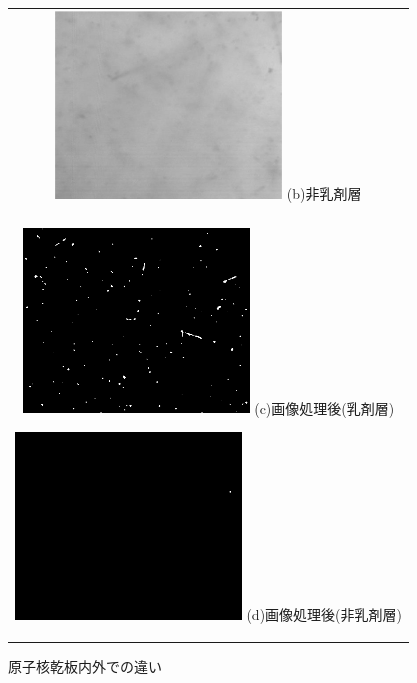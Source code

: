 \documentclass[12pt,a4paper]{jarticle}
\begin{document}
\begin{figure}[htbp]
\begin{tabular}{c}
        \begin{minipage}{0.5\hsize}
          \centering
            \includegraphics[clip, width=60mm]{emulsion_out.png}
            \hspace{1.6cm} (b)非乳剤層
        \end{minipage}
        \\
        \\
        \begin{minipage}{0.5\hsize}
          \centering
              \includegraphics[clip, width=60mm]{emul_in_thre.png}
              \hspace{1.6cm} (c)画像処理後(乳剤層)
          \end{minipage}
          
        \begin{minipage}{0.5\hsize}
          \centering
              \includegraphics[clip, width=60mm]{emul_out_thre.png}
              \hspace{1.6cm} (d)画像処理後(非乳剤層)
        \end{minipage}
    
      \end{tabular}
      \caption{原子核乾板内外での違い\label{fig:do_hyoumenn_outin_image}}
\end{figure}
\end{document}
